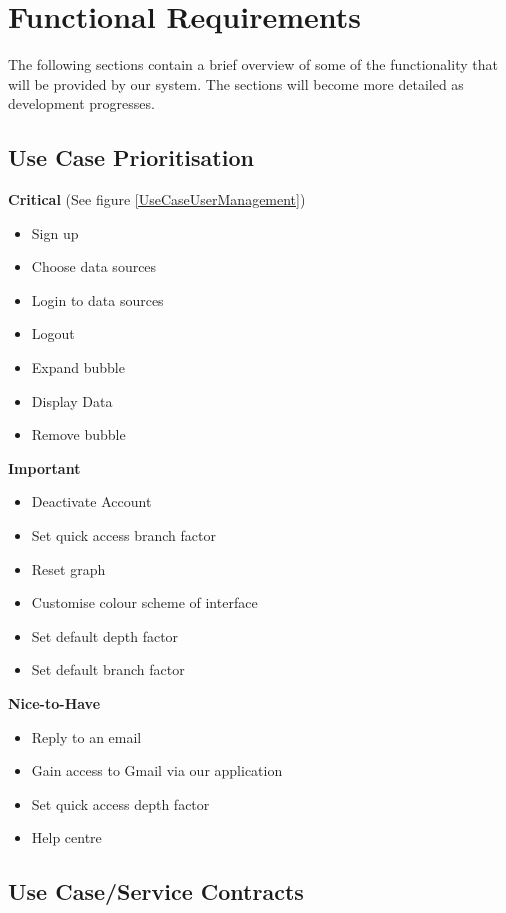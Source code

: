 \documentclass[hidelinks,english]{article}
\begin{document}
	\section{Functional Requirements}		
		The following sections contain a brief overview of some of the functionality that will be provided by our system. The sections will become more detailed as development progresses.
		\subsection{Use Case Prioritisation}
			\textbf{Critical} (See figure \ref{UseCaseUserManagement})
			\begin{itemize}
			    \item Sign up
			    \item Choose data sources
			    \item Login to data sources
			    \item Logout
			    \item Expand bubble
			   	\item Display Data
			    \item Remove bubble
			\end{itemize}
		    
		    \textbf{Important} 
			\begin{itemize}
			    \item Deactivate Account
			    \item Set quick access branch factor
				\item Reset graph
				\item Customise colour scheme of interface
			    \item Set default depth factor
			    \item Set default branch factor
			\end{itemize}
		    
			
			\textbf{Nice-to-Have}
			\begin{itemize}
			    \item Reply to an email
			    \item Gain access to Gmail via our application
			    \item Set quick access depth factor
			    \item Help centre
			\end{itemize}
			
		
		\subsection{Use Case/Service Contracts}
\end{document}
